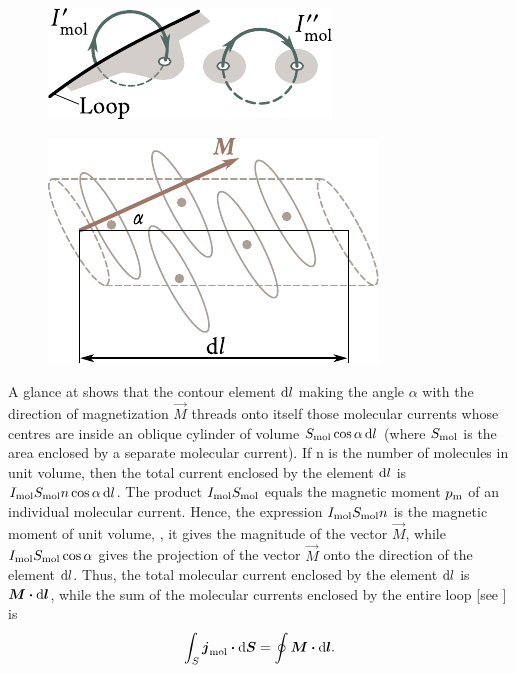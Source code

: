 \begin{figure}[t]
	\begin{minipage}[t]{0.48\linewidth}
		\begin{center}
			\includegraphics[scale=1]{figures/ch_07/fig_7_1.pdf}
			\caption[]{}
			\label{fig:7_1}
		\end{center}
	\end{minipage}
	\hfill{ }%
	\begin{minipage}[t]{0.48\linewidth}
		\begin{center}
			\includegraphics[scale=1]{figures/ch_07/fig_7_2.pdf}
			\caption[]{}
			\label{fig:7_2}
		\end{center}
	\end{minipage}
\vspace{-0.4cm}
\end{figure}

A glance at  shows that the contour element $\mathrm{d} l$ making the angle $\alpha$ with the direction of magnetization $\vec{M}$ threads onto itself those molecular currents whose centres are inside an oblique cylinder of volume $S_{\text{mol}} \cos\alpha\,\mathrm{d} l$ (where $S_{\text{mol}}$ is the area enclosed by a separate molecular current).
If n is the number of molecules in unit volume, then the total current enclosed by the element $\mathrm{d} l$ is $I_{\text{mol}} S_{\text{mol}} n \cos\alpha\, \mathrm{d} l$.
The product $I_{\text{mol}}S_{\text{mol}}$ equals the magnetic moment $p_{\text{m}}$ of an individual molecular current.
Hence, the expression $I_{\text{mol}}S_{\text{mol}}n$ is the magnetic moment of unit volume, \ie, it gives
the magnitude of the vector $\vec{M}$, while $I_{\text{mol}}S_{\text{mol}}\cos\alpha$ gives the projection of the vector $\vec{M}$ onto the direction of the element $\mathrm{d} l$.
Thus, the total molecular current enclosed by the element $\mathrm{d} l$ is $\boldsymbol{M}\boldsymbol{\cdot}\mathrm{d}\boldsymbol{l}$, while the sum of the molecular currents enclosed by the entire loop [see ] is
\begin{equation*}
    \int_S \boldsymbol{j}_{\text{mol}} \boldsymbol{\cdot} \mathrm{d}\boldsymbol{S} = \oint \boldsymbol{M} \boldsymbol{\cdot} \mathrm{d}\boldsymbol{l}.
\end{equation*}

